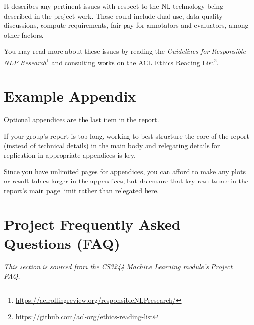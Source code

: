 \documentclass[11pt]{article}
\begin{document}
It describes any pertinent issues with respect to the NL technology being described in the project work.  These could include dual-use, data quality discussions, compute requirements, fair pay for annotators and evaluators, among other factors.  

You may read more about these issues by reading the {\it Guidelines for Responsible NLP Research}\footnote{\url{https://aclrollingreview.org/responsibleNLPresearch/}} 
and consulting works on the ACL Ethics Reading List\footnote{\url{https://github.com/acl-org/ethics-reading-list}}.

\appendix

\section{Example Appendix}
\label{sec:appendix}

Optional appendices are the last item in the report.

If your group's report is too long, working to best structure the core of the report (instead of technical details) in the main body and relegating details for replication in appropriate appendices is key.  

Since you have unlimited pages for appendices, you can afford to make any plots or result tables larger in the appendices, but do ensure that key results are in the report's main page limit rather than relegated here.

\section{Project Frequently Asked Questions (FAQ)}

{\it This section is sourced from the CS3244 Machine Learning module's Project FAQ.}

\small
\end{document}
